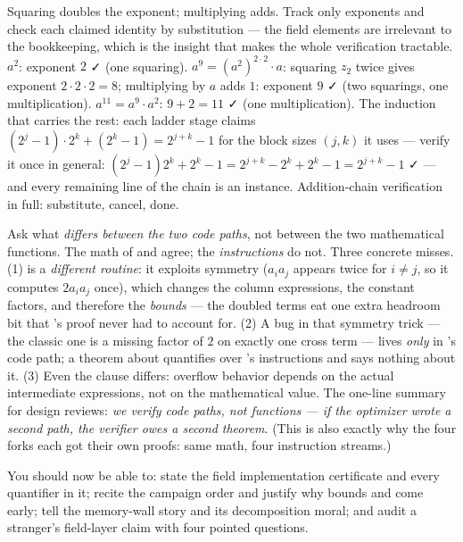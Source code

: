 \pathway Squaring doubles the exponent; multiplying adds. Track only
exponents and check each claimed identity by substitution --- the field
elements are irrelevant to the bookkeeping, which is the insight that
makes the whole verification tractable.
\answer $a^2$: exponent $2$ ✓ (one squaring).
$a^9 = (a^2)^{2\cdot 2} \cdot a$: squaring $z_2$ twice gives exponent
$2 \cdot 2 \cdot 2 = 8$; multiplying by $a$ adds $1$: exponent $9$ ✓
(two squarings, one multiplication).
$a^{11} = a^9 \cdot a^2$: $9 + 2 = 11$ ✓ (one multiplication).
The induction that carries the rest: each ladder stage claims
$(2^j - 1)\cdot 2^k + (2^k - 1) = 2^{j+k} - 1$ for the block sizes
$(j,k)$ it uses --- verify it once in general:
$(2^j - 1)2^k + 2^k - 1 = 2^{j+k} - 2^k + 2^k - 1 = 2^{j+k} - 1$ ✓ ---
and every remaining line of the chain is an instance. Addition-chain
verification in full: substitute, cancel, done.

\pathway Ask what \emph{differs between the two code paths}, not between
the two mathematical functions. The math of  and
 agree; the \emph{instructions} do not.
\answer Three concrete misses. (1)  is a \emph{different
routine}: it exploits symmetry ($a_i a_j$ appears twice for $i \neq j$,
so it computes $2 a_i a_j$ once), which changes the column expressions,
the constant factors, and therefore the \emph{bounds} --- the doubled
terms eat one extra headroom bit that 's proof never had to
account for. (2) A bug in that symmetry trick --- the classic one is a
missing factor of $2$ on exactly one cross term --- lives \emph{only} in
's code path; a theorem about  quantifies over
's instructions and says nothing about it. (3) Even the
 clause differs: overflow behavior depends on the actual
intermediate expressions, not on the mathematical value. The one-line
summary for design reviews: \emph{we verify code paths, not functions ---
if the optimizer wrote a second path, the verifier owes a second
theorem}. (This is also exactly why the four forks each got their own
proofs: same math, four instruction streams.)

\begin{checkpoint}
You should now be able to: state the field implementation certificate and
every quantifier in it; recite the campaign order and justify why bounds
and  come early; tell the memory-wall story and its
decomposition moral; and audit a stranger's field-layer claim with four
pointed questions.
\end{checkpoint}
